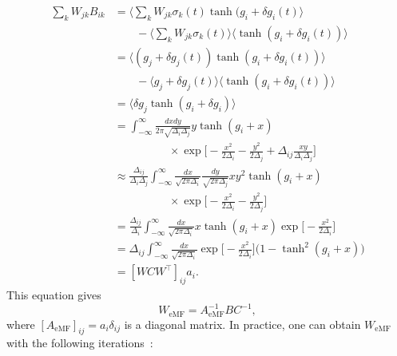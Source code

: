 \documentclass[prx,twocolumn,twoside,showpacs,superscriptaddress]{revtex4-1}
\begin{document}
\begin{align}
\sum_k W_{jk} B_{ik} &= \big\langle \sum_k W_{jk} \sigma_k(t) \tanh (g_i + \delta g_i(t) \big\rangle \nonumber \\
& \phantom{MM} - \big\langle \sum_k W_{jk} \sigma_k(t) \big\rangle \big\langle \tanh(g_i + \delta g_i(t)) \big\rangle \nonumber \\
&= \langle (g_j + \delta g_j(t)) \tanh (g_i + \delta g_i(t)) \rangle \nonumber \\
&  \phantom{MM} - \langle g_j + \delta g_j(t) \rangle \langle \tanh (g_i + \delta g_i(t)) \rangle \nonumber \\
&= \langle \delta g_j \tanh (g_i + \delta g_i) \rangle \nonumber \\
&= \int_{-\infty}^{\infty} \frac{dx dy}{2 \pi \sqrt{\Delta_i \Delta_j}} y \tanh(g_i + x) \nonumber \\
& \phantom{MMMMM} \times \exp \bigg[-\frac{x^2}{2 \Delta_i} - \frac{y^2}{2 \Delta_j} + \Delta_{ij} \frac{xy}{\Delta_i \Delta_j} \bigg]  \nonumber \\
&\approx \frac{\Delta_{ij}}{\Delta_i \Delta_j} \int_{-\infty}^{\infty} \frac{dx}{\sqrt{2 \pi \Delta_i}} \frac{dy}{\sqrt{2 \pi \Delta_j}} xy^2 \tanh(g_i + x) \nonumber \\
& \phantom{MMMMM} \times \exp \bigg[-\frac{x^2}{2 \Delta_i} - \frac{y^2}{2 \Delta_j} \bigg] \nonumber \\
&= \frac{\Delta_{ij}}{\Delta_i} \int_{-\infty}^{\infty} \frac{dx}{\sqrt{2 \pi \Delta_i}} x \tanh(g_i + x) \exp \bigg[-\frac{x^2}{2 \Delta_i} \bigg] \nonumber \\
&= \Delta_{ij} \int_{-\infty}^{\infty} \frac{dx}{\sqrt{2 \pi \Delta_i}} \exp \bigg[-\frac{x^2}{2 \Delta_i} \bigg] \big( 1 - \tanh^2 (g_i + x) \big) \nonumber \\
& = [W C W^\top]_{ij} a_i.
\end{align}
This equation gives
\begin{equation}
W_{\text{eMF}} = A_{\text{eMF}}^{-1} B C^{-1},
\end{equation}
where $[A_{\text{eMF}}]_{ij} = a_i \delta_{ij}$ is a diagonal matrix.
In practice, one can obtain $W_{\text{eMF}}$ with the following iterations~\cite{Mezard2011}:
\end{document}
